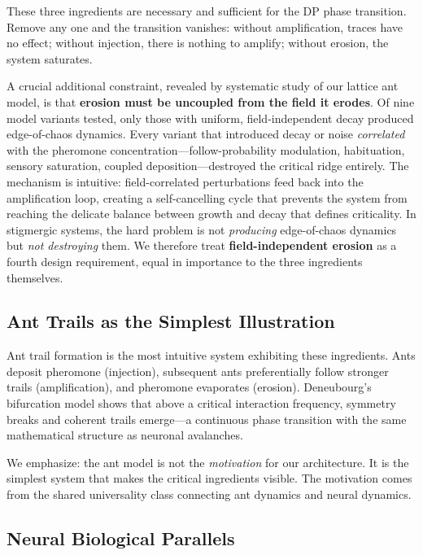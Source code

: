 \documentclass[11pt,a4paper]{article}
\begin{document}
These three ingredients are necessary and sufficient for the DP phase
transition.  Remove any one and the transition vanishes: without
amplification, traces have no effect; without injection, there is
nothing to amplify; without erosion, the system saturates.

A crucial additional constraint, revealed by systematic study of
our lattice ant model, is that \textbf{erosion must be uncoupled from
the field it erodes}.  Of nine model variants tested, only those with
uniform, field-independent decay produced edge-of-chaos dynamics.
Every variant that introduced decay or noise \emph{correlated} with
the pheromone concentration---follow-probability modulation,
habituation, sensory saturation, coupled deposition---destroyed the
critical ridge entirely.  The mechanism is intuitive: field-correlated
perturbations feed back into the amplification loop, creating a
self-cancelling cycle that prevents the system from reaching the
delicate balance between growth and decay that defines criticality.
In stigmergic systems, the hard problem is not \emph{producing}
edge-of-chaos dynamics but \emph{not destroying} them.  We therefore
treat \textbf{field-independent erosion} as a fourth design
requirement, equal in importance to the three ingredients themselves.

\subsection{Ant Trails as the Simplest Illustration}

Ant trail formation is the most intuitive system exhibiting these
ingredients.  Ants deposit pheromone (injection), subsequent ants
preferentially follow stronger trails (amplification), and pheromone
evaporates (erosion).  Deneubourg's bifurcation model
\cite{deneubourg1990} shows that above a critical interaction
frequency, symmetry breaks and coherent trails emerge---a continuous
phase transition with the same mathematical structure as neuronal
avalanches.

We emphasize: the ant model is not the \emph{motivation} for our
architecture.  It is the simplest system that makes the critical
ingredients visible.  The motivation comes from the shared
universality class connecting ant dynamics and neural dynamics.

\subsection{Neural Biological Parallels}
\end{document}
